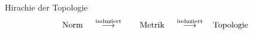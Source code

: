 \documentclass[class=article, crop=false]{standalone}
\begin{document}
\begin{zettel}{Hirachie der Topologie}
    \begin{align*}
        &\tx{ Norm } \stackrel{\tx{ induziert } }{\longrightarrow} &\tx{ Metrik }  \stackrel{\tx{ induziert } }{\longrightarrow} &\tx{ Topologie }\\
    \end{align*}
\end{zettel}
\end{document}
